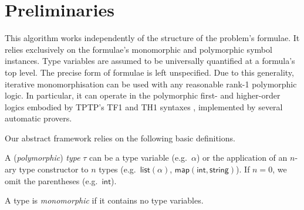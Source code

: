 \documentclass[]{ceurart}
\newcommand\ty[1]{\textsf{#1}}
\begin{document}
\section{Preliminaries}
\label{sec:preliminaries}

This algorithm works independently of the structure of the problem's formulae. It relies exclusively on the formulae's monomorphic and polymorphic symbol instances. Type variables are assumed to be universally quantified at a formula's top level. The precise form of formulae is left unspecified.
%
Due to this generality, iterative monomorphisation can be used with any reasonable rank-1 polymorphic logic. In particular, it can operate in the polymorphic first- and higher-order logics embodied by TPTP's TF1 and TH1 syntaxes \cite{blanchette-paskevich-2013,th1}, implemented by several automatic provers.


%
%
%


Our abstract framework relies on the following basic definitions.

\begin{definition}%
A (\emph{polymorphic}) \emph{type} \(\tau\) can be a type variable (e.g.\ \(\alpha\)) or
the application of an \(n\)-ary type constructor to \(n\) types (e.g.\ \(\ty{list}(\alpha)\), \(\ty{map}(\ty{int},\ty{string})\)).
If $n = 0$, we omit the parentheses (e.g.\ \(\ty{int}\)).
\end{definition}

\begin{definition}%
A type is \emph{monomorphic} if it contains no type variables.
\end{definition}
\end{document}
